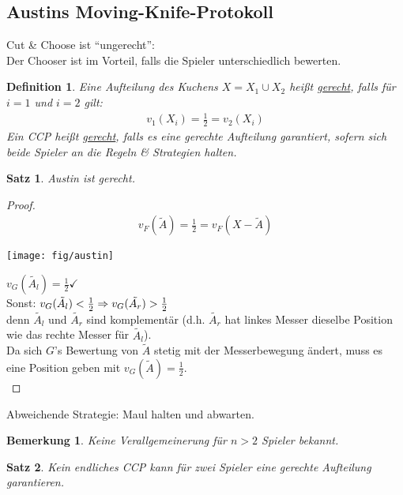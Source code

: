 \documentclass[a4paper,10pt]{scrartcl}
\newtheorem*{bemerkung*}{Bemerkung}
\newtheorem*{definition*}{Definition}
\newtheorem*{satz*}{Satz}
\begin{document}
\subsection{Austins Moving-Knife-Protokoll}
Cut \& Choose ist ``ungerecht'':\\
Der Chooser ist im Vorteil, falls die Spieler unterschiedlich bewerten.
\begin{definition*}
 Eine Aufteilung des Kuchens $X=X_1\cup X_2$ heißt \underline{gerecht}, falls für $i=1$ und $i=2$ gilt:
 \begin{align*}
  v_1(X_i)=\frac{1}{2}=v_2(X_i)
 \end{align*}
 Ein CCP heißt \underline{gerecht}, falls es eine gerechte Aufteilung garantiert, sofern sich beide Spieler an die Regeln \& Strategien 
 halten.
\end{definition*}

\begin{satz*}
 Austin ist gerecht.
\end{satz*}
\begin{proof}
 \begin{align*}
  v_F(\tilde{A})=\frac{1}{2}=v_F(X-\tilde{A})
 \end{align*}
 \begin{center}
  \texttt{[image: fig/austin]}
 \end{center}

 $v_G(\tilde{A_l})=\frac{1}{2}\checkmark$\\Sonst: $v_G(\tilde{A_l})<\frac{1}{2}\\\Rightarrow v_G(\tilde{A_r})>\frac{1}{2}$\\
 denn $\tilde{A_l}$ und $\tilde{A_r}$ sind komplementär (d.h. $\tilde{A_r}$ hat linkes Messer dieselbe Position wie das rechte Messer für
 $\tilde{A_l}$).\\
Da sich $G$'s Bewertung von $\tilde{A}$ stetig mit der Messerbewegung ändert, muss es eine Position geben mit $v_G(\tilde{A})=\frac{1}{2}$.\\
\end{proof}
Abweichende Strategie: Maul halten und abwarten.
\begin{bemerkung*}
 Keine Verallgemeinerung für $n>2$ Spieler bekannt.
\end{bemerkung*}
\begin{satz*}
 Kein endliches CCP kann für zwei Spieler eine gerechte Aufteilung garantieren.
\end{satz*}
\end{document}

